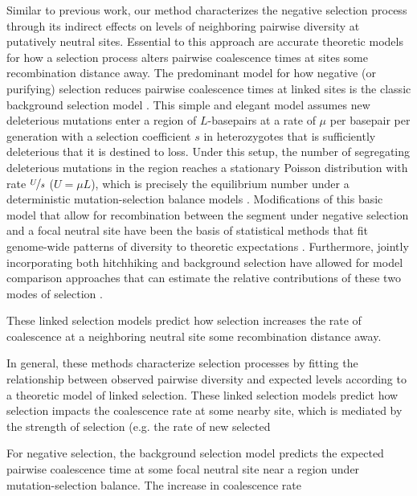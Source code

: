 \documentclass[11pt]{article}
\begin{document}
Similar to previous work, our method characterizes the negative selection
process through its indirect effects on levels of neighboring pairwise
diversity at putatively neutral sites. Essential to this approach are accurate
theoretic models for how a selection process alters pairwise coalescence times
at sites some recombination distance away. The predominant model for how
negative (or purifying) selection reduces pairwise coalescence times at linked
sites is the classic background selection model
\parencite{Charlesworth1993-gb}. This simple and elegant model assumes new
deleterious mutations enter a region of $L$-basepairs at a rate of $\mu$ per
basepair per generation with a selection coefficient $s$ in heterozygotes that
is sufficiently deleterious that it is destined to loss. Under this setup, the
number of segregating deleterious mutations in the region reaches a stationary
Poisson distribution with rate $\nicefrac{U}{s}$ ($U=\mu L$), which is
precisely the equilibrium number under a deterministic mutation-selection
balance models \parencite{Kimura1966-bk,Crow1970-wj}. Modifications of this
basic model that allow for recombination between the segment under negative
selection and a focal neutral site \parencite{Nordborg1996-nq,Hudson1994-oh}
have been the basis of statistical methods that fit genome-wide patterns of
diversity to theoretic expectations \parencite{McVicker2009-ax,Hudson1995-xc}.
Furthermore, jointly incorporating both hitchhiking and background selection
have allowed for model comparison approaches that can estimate the relative
contributions of these two modes of selection
\parencite{Elyashiv2016-vt,Murphy2022-sj}.




These linked selection models predict how selection increases the rate
of coalescence at a neighboring neutral site some recombination distance away. 



In general, these methods characterize selection processes by fitting the
relationship between observed pairwise diversity and expected levels according
to a theoretic model of linked selection. These linked selection models predict
how selection impacts the coalescence rate at some nearby site, which is
mediated by the strength of selection (e.g. the rate of new selected 

For negative selection, the background
selection model predicts the expected pairwise coalescence time at some focal
neutral site near a region under mutation-selection balance. The increase in
coalescence rate 
\end{document}
